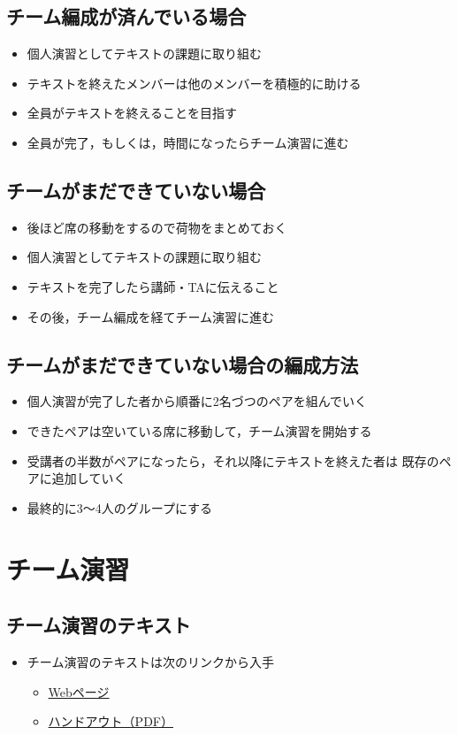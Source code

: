 \documentclass[a4paper,twoside,twocolumn]{bxjsarticle}
\begin{document}
\subsection{チーム編成が済んでいる場合}
\label{sec-3-2}
\begin{itemize}
\item 個人演習としてテキストの課題に取り組む
\item テキストを終えたメンバーは他のメンバーを積極的に助ける
\item 全員がテキストを終えることを目指す
\item 全員が完了，もしくは，時間になったらチーム演習に進む
\end{itemize}

\subsection{チームがまだできていない場合}
\label{sec-3-3}
\begin{itemize}
\item 後ほど席の移動をするので荷物をまとめておく
\item 個人演習としてテキストの課題に取り組む
\item テキストを完了したら講師・TAに伝えること
\item その後，チーム編成を経てチーム演習に進む
\end{itemize}

\subsection{チームがまだできていない場合の編成方法}
\label{sec-3-4}
\begin{itemize}
\item 個人演習が完了した者から順番に2名づつのペアを組んでいく
\item できたペアは空いている席に移動して，チーム演習を開始する
\item 受講者の半数がペアになったら，それ以降にテキストを終えた者は
既存のペアに追加していく
\item 最終的に3〜4人のグループにする
\end{itemize}

\section{チーム演習}
\label{sec-4}
\subsection{チーム演習のテキスト}
\label{sec-4-1}
\begin{itemize}
\item チーム演習のテキストは次のリンクから入手
\begin{itemize}
\item \href{https://github.com/ychubachi/github_practice/blob/master/github_practice-team_handout.org}{Webページ}
\item \href{https://github.com/ychubachi/github_practice/raw/master/github_practice-team_handout.pdf}{ハンドアウト（PDF）}
\end{itemize}
\end{itemize}
\end{document}
